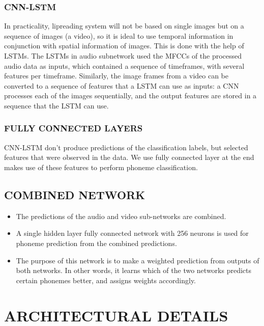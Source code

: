 \documentclass{article}
\begin{document}
\subsubsection{CNN\--LSTM}
In practicality, lipreading system will not be based on single images but on a sequence of images (a video), so it is ideal to use temporal information in conjunction with spatial information of images. This is done with the help of LSTMs. The LSTMs in audio subnetwork used the MFCCs of the processed audio data as inputs, which contained a sequence of timeframes, with several features per timeframe. Similarly, the image frames from a video can be converted to a sequence of features that a LSTM can use as inputs: a CNN processes each of the images sequentially, and the output features are stored in a sequence that the LSTM can use.\cite{blendingLSTMCNN}
\subsubsection{FULLY CONNECTED LAYERS}
CNN-LSTM don't produce predictions of the classification labels, but selected features that were observed in the data. We use fully connected layer at the end makes use of these features to perform phoneme classification. 
\subsection{COMBINED NETWORK}
\begin{itemize}
    \item The predictions of the audio and video sub-networks are combined. 
    \item A single hidden layer fully connected network with 256 neurons is used for phoneme prediction from the combined predictions.
    \item The purpose of this network is to make a weighted prediction from outputs of both networks. In other words, it learns which of the two networks predicts certain phonemes better, and assigns weights accordingly.
\end{itemize}


\section{ARCHITECTURAL DETAILS}
\end{document}
